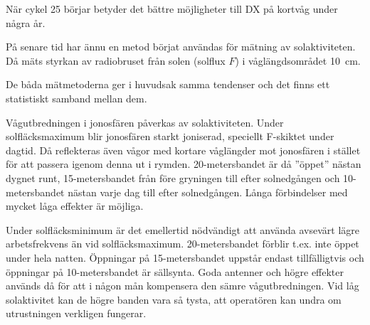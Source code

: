 När cykel 25 börjar betyder det bättre möjligheter till DX på kortvåg under
några år.

På senare tid har ännu en metod börjat användas för mätning av solaktiviteten.
Då mäts styrkan av radiobruset från solen (solflux \(F\)) i våglängdsområdet
10~cm.

De båda mätmetoderna ger i huvudsak samma tendenser och det finns ett
statistiskt samband mellan dem.

Vågutbredningen i jonosfären påverkas av solaktiviteten.
Under solfläcksmaximum blir jonosfären starkt joniserad, speciellt F-skiktet
under dagtid.
Då reflekteras även vågor med kortare våglängder mot jonosfären i stället för
att passera igenom denna ut i rymden.
20-metersbandet är då ''öppet'' nästan dygnet runt, 15-metersbandet från före
gryningen till efter solnedgången och 10-metersbandet nästan varje dag till
efter solnedgången.
Långa förbindelser med mycket låga effekter är möjliga.

Under solfläcksminimum är det emellertid nödvändigt att använda avsevärt lägre
arbetsfrekvens än vid solfläcksmaximum.
20-metersbandet förblir t.ex. inte öppet under hela natten.
Öppningar på 15-metersbandet uppstår endast tillfälligtvis och öppningar på
10-metersbandet är sällsynta.
Goda antenner och högre effekter används då för att i någon mån kompensera den
sämre vågutbredningen.
Vid låg solaktivitet kan de högre banden vara så tysta, att operatören kan
undra om utrustningen verkligen fungerar.
